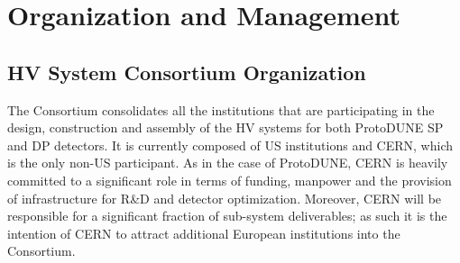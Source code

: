 %






\section{Organization and Management}
\label{sec:fdsp-hv-org}


\subsection{HV System Consortium Organization}
\label{sec:fdsp-hv-org-consortium}

The Consortium consolidates all the institutions that are participating in the design, construction and assembly of the HV systems for both ProtoDUNE SP and DP detectors. It is currently composed of US institutions and CERN, which is the only non-US participant. As in the case of ProtoDUNE, CERN is heavily committed to a significant role in terms of funding, manpower and the provision of infrastructure for R\&D and detector optimization. Moreover, CERN will be responsible for a significant fraction of sub-system deliverables; as such it is the intention of CERN to attract additional European institutions into the Consortium.


